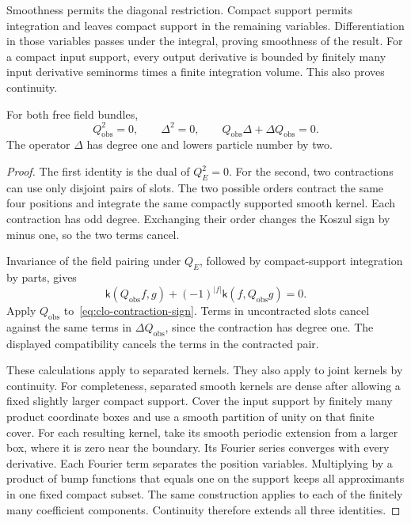 Smoothness permits the diagonal restriction.
Compact support permits integration and leaves compact support in the
remaining variables. Differentiation in those variables passes under the
integral, proving smoothness of the result.
For a compact input support, every output derivative is bounded by
finitely many input derivative seminorms times a finite integration volume.
This also proves continuity.

\begin{proposition}\label{prop:clo-bv-identities}
For both free field bundles,
\[
 Q_{\mathrm{obs}}^2=0,\qquad \Delta^2=0,\qquad
 Q_{\mathrm{obs}}\Delta+\Delta Q_{\mathrm{obs}}=0.
\]
The operator $\Delta$ has degree one and lowers particle number by two.
\end{proposition}

\begin{proof}
The first identity is the dual of $Q_E^2=0$.
For the second, two contractions can use only disjoint pairs of slots.
The two possible orders contract the same four positions and integrate
the same compactly supported smooth kernel.
Each contraction has odd degree. Exchanging their order changes the
Koszul sign by minus one, so the two terms cancel.

Invariance of the field pairing under $Q_E$, followed by compact-support
integration by parts, gives
\[
 \mathsf k(Q_{\mathrm{obs}}f,g)
 +(-1)^{|f|}\mathsf k(f,Q_{\mathrm{obs}}g)=0.
\]
Apply $Q_{\mathrm{obs}}$ to~\eqref{eq:clo-contraction-sign}.
Terms in uncontracted slots cancel against the same terms in
$\Delta Q_{\mathrm{obs}}$, since the contraction has degree one.
The displayed compatibility cancels the terms in the contracted pair.

These calculations apply to separated kernels. They also apply to joint
kernels by continuity. For completeness, separated smooth kernels are
dense after allowing a fixed slightly larger compact support.
Cover the input support by finitely many product coordinate boxes and
use a smooth partition of unity on that finite cover.
For each resulting kernel, take its smooth periodic extension from a
larger box, where it is zero near the boundary.
Its Fourier series converges with every derivative.
Each Fourier term separates the position variables.
Multiplying by a product of bump functions that equals one on the
support keeps all approximants in one fixed compact subset.
The same construction applies to each of the finitely many coefficient
components. Continuity therefore extends all three identities.
\end{proof}

